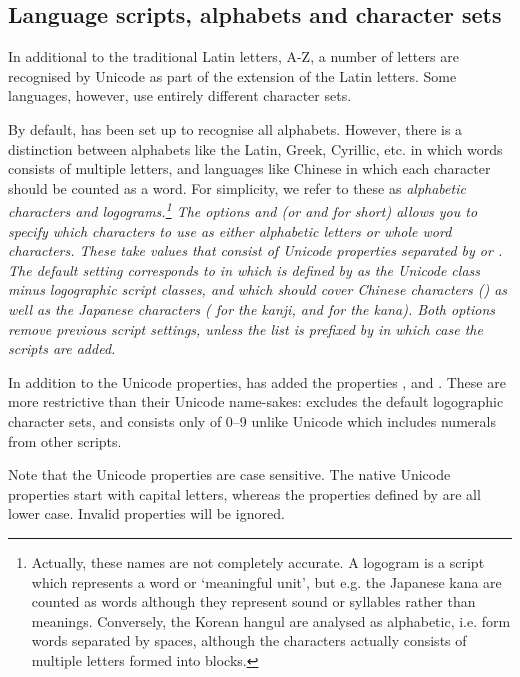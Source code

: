 \documentclass{article}
\begin{document}
\subsection{Language scripts, alphabets and character sets}

In additional to the traditional Latin letters, A-Z, a number of letters are recognised by Unicode as part of the extension of the Latin letters. Some languages, however, use entirely different character sets.

By default, \TeXcount{} has been set up to recognise all alphabets. However, there is a distinction between alphabets like the Latin, Greek, Cyrillic, etc. in which words consists of multiple letters, and languages like Chinese in which each character should be counted as a word. For simplicity, we refer to these as \em{alphabetic} characters and \em{logograms}.\footnote{%
Actually, these names are not completely accurate. A logogram is a script which represents a word or `meaningful unit', but e.g. the Japanese kana are counted as words although they represent sound or syllables rather than meanings. Conversely, the Korean hangul are analysed as alphabetic, i.e. form words separated by spaces, although the characters actually consists of multiple letters formed into blocks.}
The options  and  (or  and  for short) allows you to specify which characters to use as either alphabetic letters or whole word characters. These take values that consist of Unicode properties separated by \code{,} or \code{+}. The default setting corresponds to
in which  is defined by \TeXcount{} as the Unicode  class minus logographic script classes, and
which should cover Chinese characters () as well as the Japanese characters ( for the kanji,  and  for the kana). Both options remove previous script settings, unless the list is prefixed by \code{+} in which case the scripts are added. 

In addition to the Unicode properties, \TeXcount{} has added the properties ,  and . These are more restrictive than their Unicode name-sakes:  excludes the default logographic character sets, and  consists only of 0--9 unlike Unicode  which includes numerals from other scripts.

Note that the Unicode properties are case sensitive. The native Unicode properties start with capital letters, whereas the properties defined by \TeXcount{} are all lower case. Invalid properties will be ignored.
\end{document}
